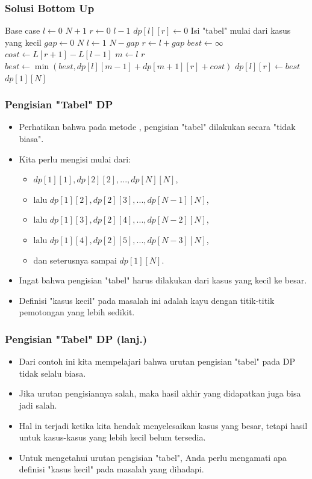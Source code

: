 \begin{frame}
\frametitle{Solusi Bottom Up}
\begin{small}
\begin{codebox}
\li \Comment Base case
\li \For $l \gets 0$ \To $N+1$ \Do
\li   \For $r \gets 0$ \To $l-1$ \Do
\li     $dp[l][r] \gets 0$
      \End
    \End
\zi
\li \Comment Isi "tabel" mulai dari kasus yang kecil
\li \For $gap \gets 0$ \To $N$ \Do
\li   \For $l \gets 1$ \To $N-gap$ \Do
\li     $r \gets l + gap$
\li     $best \gets \infty$
\li     $cost \gets L[r+1] - L[l-1]$
\li     \For $m \gets l$ \To $r$ \Do
\li       $best \gets \min(best, dp[l][m-1] + dp[m+1][r] + cost)$
        \End  
\li     $dp[l][r] \gets best$
      \End
    \End
\zi
\li \Return $dp[1][N]$
\end{codebox}
\end{small}
\end{frame}

\begin{frame}
\frametitle{Pengisian "Tabel" DP}
\begin{itemize}
  \item Perhatikan bahwa pada metode \fbottomup, pengisian "tabel" dilakukan secara "tidak biasa".
  \item Kita perlu mengisi mulai dari:
  \begin{itemize}
    \item $dp[1][1], dp[2][2], ..., dp[N][N]$,
    \item lalu $dp[1][2], dp[2][3], ..., dp[N-1][N]$,
    \item lalu $dp[1][3], dp[2][4], ..., dp[N-2][N]$,
    \item lalu $dp[1][4], dp[2][5], ..., dp[N-3][N]$,    
    \item dan seterusnya sampai $dp[1][N]$.
  \end{itemize}
  \item Ingat bahwa pengisian "tabel" harus dilakukan dari kasus yang kecil ke besar.
  \item Definisi "kasus kecil" pada masalah ini adalah kayu dengan titik-titik pemotongan yang lebih sedikit.
\end{itemize}
\end{frame}

\begin{frame}
\frametitle{Pengisian "Tabel" DP (lanj.)}
\begin{itemize}
  \item Dari contoh ini kita mempelajari bahwa urutan pengisian "tabel" pada DP \fbottomup tidak selalu biasa.
  \item Jika urutan pengisiannya salah, maka hasil akhir yang didapatkan juga bisa jadi salah.
  \item Hal in terjadi ketika kita hendak menyelesaikan kasus yang besar, tetapi hasil untuk kasus-kasus yang lebih kecil belum tersedia.
  \item Untuk mengetahui urutan pengisian "tabel", Anda perlu mengamati apa definisi "kasus kecil" pada masalah yang dihadapi.
\end{itemize}
\end{frame}


